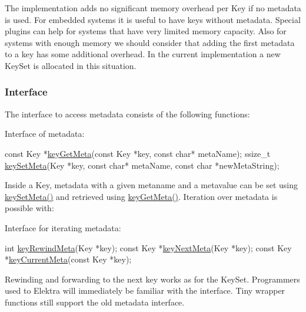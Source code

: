 The implementation adds no significant memory overhead per {\ttfamily Key} if no metadata is used. For embedded systems it is useful to have keys without metadata. Special plugins can help for systems that have very limited memory capacity. Also for systems with enough memory we should consider that adding the first metadata to a key has some additional overhead. In the current implementation a new {\ttfamily Key\+Set} is allocated in this situation.

\subsubsection*{Interface}

The interface to access metadata consists of the following functions\+:

Interface of metadata\+:


\begin{DoxyCode}
\textcolor{keyword}{const} Key *\hyperlink{group__keymeta_ga9ed3875495ddb3d8a8d29158a60a147c}{keyGetMeta}(\textcolor{keyword}{const} Key *key, \textcolor{keyword}{const} \textcolor{keywordtype}{char}* metaName);
ssize\_t    \hyperlink{group__keymeta_gae1f15546b234ffb6007d8a31178652b9}{keySetMeta}(Key *key, \textcolor{keyword}{const} \textcolor{keywordtype}{char}* metaName,
        \textcolor{keyword}{const} \textcolor{keywordtype}{char} *newMetaString);
\end{DoxyCode}


Inside a {\ttfamily Key}, metadata with a given metaname and a metavalue can be set using {\ttfamily \hyperlink{group__keymeta_gae1f15546b234ffb6007d8a31178652b9}{key\+Set\+Meta()}} and retrieved using {\ttfamily \hyperlink{group__keymeta_ga9ed3875495ddb3d8a8d29158a60a147c}{key\+Get\+Meta()}}. Iteration over metadata is possible with\+:

Interface for iterating metadata\+:


\begin{DoxyCode}
\textcolor{keywordtype}{int} \hyperlink{group__keymeta_ga5dbb669802eea27e106ee3a5e39717a9}{keyRewindMeta}(Key *key);
\textcolor{keyword}{const} Key *\hyperlink{group__keymeta_ga4c88342f580a4291455a801af71ce048}{keyNextMeta}(Key *key);
\textcolor{keyword}{const} Key *\hyperlink{group__keymeta_ga74a273f529030f4947df52e14fdd2869}{keyCurrentMeta}(\textcolor{keyword}{const} Key *key);
\end{DoxyCode}


Rewinding and forwarding to the next key works as for the {\ttfamily Key\+Set}. Programmers used to Elektra will immediately be familiar with the interface. Tiny wrapper functions still support the old metadata interface.

